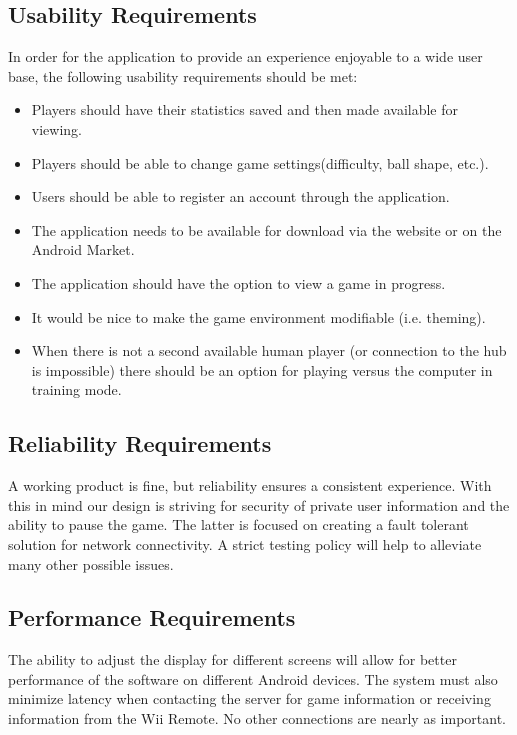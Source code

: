 \documentclass[12pt]{article}
\begin{document}


\subsection{Usability Requirements}
In order for the application to provide an experience enjoyable to a wide user base, the following usability requirements should be met:
\begin{itemize}
\item Players should have their statistics saved and then made available for viewing.
\item Players should be able to change game settings(difficulty, ball shape, etc.).
\item Users should be able to register an account through the application.
\item The application needs to be available for download via the website or on the Android Market.
\item The application should have the option to view a game in progress.
\item It would be nice to make the game environment modifiable (i.e. theming).
\item When there is not a second available human player (or connection to the hub is impossible) there should be an option for playing versus the computer in training mode.
\end{itemize}

\subsection{Reliability Requirements}
A working product is fine, but reliability ensures a consistent experience.  With this in mind our design is striving for security of private user information and the ability to pause the game.  The latter is focused on creating a fault tolerant solution for network connectivity.  A strict testing policy will help to alleviate many other possible issues.

\subsection{Performance Requirements}
The ability to adjust the display for different screens will allow for better performance of the software on different Android devices.  The system must also minimize latency when contacting the server for game information or receiving information from the Wii Remote.  No other connections are nearly as important.
\end{document}
